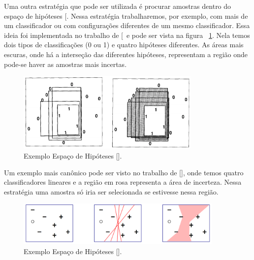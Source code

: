 Uma outra estratégia que pode ser utilizada é procurar amostras dentro do espaço de hipóteses [\cite{mitchell1978version, mitchell1982generalization}. Nessa estratégia trabalharemos, por exemplo, com mais de um classificador ou com configurações diferentes de um mesmo classificador. Essa ideia foi implementada no trabalho de [\cite{atlas1990training,cohn1994improving}\ e pode ser vista na figura ~\ref{fig:cohn_1994_hypothesis_space_example}. Nela temos dois tipos de classificações (0 ou 1) e quatro hipóteses diferentes. As áreas mais escuras, onde há a interseção das diferentes hipóteses, representam a região onde pode-se haver as amostras mais incertas. 

\begin{figure}
  \centering
  \includegraphics[width=0.8\textwidth]{figures/cohn_1994_hypothesis_space_example.png}
  \caption{Exemplo Espaço de Hipóteses [\cite{cohn1994improving}].}
  \label{fig:cohn_1994_hypothesis_space_example}
\end{figure}

Um exemplo mais canônico pode ser visto no trabalho de [\cite{dasgupta2011two}], onde temos quatro classificadores lineares e a região em rosa representa a área de incerteza. Nessa estratégia uma amostra só iria ser selecionada se estivesse nessa região.

\begin{figure}
  \centering
  \includegraphics[width=0.9\textwidth]{figures/dasgupta_two_faces_hypothesis_example.png}
  \caption{Exemplo Espaço de Hipóteses [\cite{dasgupta2011two}].}
  \label{fig:dasgupta_two_faces_hypothesis_example}
\end{figure}

